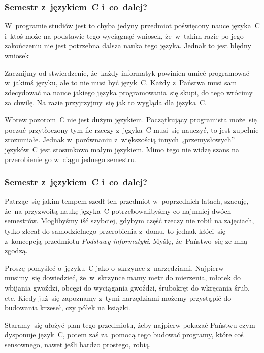 \documentclass[10pt,t]{beamer}
\begin{document}
\begin{frame}
  \frametitle{Semestr z~językiem~C i~co~dalej?}


  W~programie studiów jest to chyba jedyny przedmiot poświęcony nauce
  języka~C i~ktoś może na podstawie tego wyciągnąć wniosek, że~w~takim
  razie po jego zakończeniu nie jest potrzebna dalsza nauka tego języka.
  Jednak to jest błędny wniosek

  Zacznijmy od stwierdzenie, że~każdy informatyk powinien umieć programować
  w~jakimś języku, ale to \alert{nie} musi być język~C. Każdy z~Państwa
  musi sam zdecydować na nauce jakiego języka programowania~się skupi, do
  tego wrócimy za chwilę. Na razie przyjrzyjmy~się jak to wygląda
  dla języka~C.

  Wbrew pozorom~C nie jest dużym językiem. Początkujący programista może~się
  poczuć przytłoczony tym ile rzeczy z~języka~C musi~się nauczyć, to jest
  zupełnie zrozumiałe. Jednak w~porównaniu z~większością innych
  „przemysłowych” języków~C jest stosunkowo małym językiem. Mimo tego nie
  widzę szans na przerobienie go w~ciągu jednego semestru.

\end{frame}





\begin{frame}
  \frametitle{Semestr z~językiem~C i~co~dalej?}


  Patrząc~się jakim tempem szedł ten przedmiot w~poprzednich latach,
  szacuję, że~na przyzwoitą naukę języka~C potrzebowalibyśmy co najmniej
  dwóch semestrów. Moglibyśmy iść szybciej, gdybym część rzeczy nie robił
  na zajęciach, tylko zlecał do samodzielnego przerobienia z~domu, to
  jednak kłóci~się z~koncepcją przedmiotu \textit{\alert{Podstawy}
    informatyki}. Myślę, że~Państwo~się ze mną zgodzą.

  Proszę pomyśleć o~języku~C jako o~skrzynce z~narzędziami. Najpierw
  musimy~się dowiedzieć, że~w~skrzynce mamy metr do mierzenia,
  młotek do wbijania gwoździ, obcęgi do wyciągania gwoździ, śrubokręt do
  wkręcania śrub, etc. Kiedy już~się zapoznamy z~tymi narzędziami możemy
  przystąpić do budowania krzeseł, czy półek na książki.

  Staramy~się ułożyć plan tego przedmiotu, żeby najpierw pokazać Państwu
  czym dysponuje język~C, potem zaś za~pomocą tego budować programy, które
  coś sensownego, nawet jeśli bardzo prostego, robią.

\end{frame}
\end{document}
